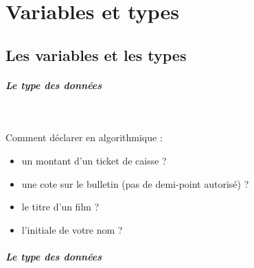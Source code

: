 \documentclass[11pt,a4paper]{article}
\begin{document}
            \begin{abstract}
			Ces exercices ont pour but de v\'erifier que vous avez fix\'e les bases du LDA et de la programmation Java.
		
            \par
        
            \par
        
            \par
        \end{abstract}
				\vspace{-2em}\tableofcontents
				\pagestyle{plain}
            \clearpage
            \fancyhead[L,C,R]{}
            \fancyfoot[L,C]{}
            \fancyfoot[R]{ \scriptsize{\textcolor{gray}{
				InitSeq - page \thepage}}}
				\thispagestyle{fancy}
				\pagestyle{fancy}
	   
            \section{Variables et types}\subsection{Les variables et les types}
			
		\subparagraph{Le type des donn\'ees} 
		
                \textcolor{white}{.} \par
             
								Comment d\'eclarer en algorithmique :
							
					\begin{itemize}
				
			\item un montant d'un ticket de caisse ?  \textcolor{gray}{\underline{\hspace*{10em}}} 
			\item une cote sur le bulletin (pas de demi-point autoris\'e) ?  \textcolor{gray}{\underline{\hspace*{10em}}} 
			\item le titre d'un film ? \textcolor{gray}{\underline{\hspace*{10em}}} 
			\item l'initiale de votre nom ? \textcolor{gray}{\underline{\hspace*{10em}}} 
					\end{itemize}
				
			
		\subparagraph{Le type des donn\'ees} 
		
\end{document}
